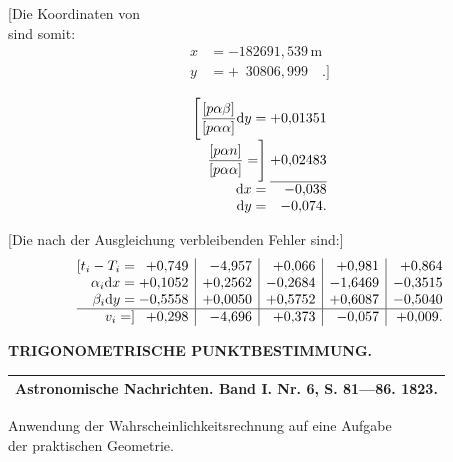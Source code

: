 \noindent
\begin{minipage}[t]{.55\linewidth}
 [Die Koordinaten von \\
 sind somit:
 \[
 \begin{aligned}
  x&=-182691{,}539\,\mathrm{m}\\
  y&=+\phantom{1}30806{,}999\quad .]
 \end{aligned}
 \]
\end{minipage}\hfill
\begin{minipage}[t]{.43\linewidth}
 \[
 \begin{array}{@{}r@{\;}r@{}}
  \Biggl[\dfrac{[p\alpha\beta]}{[p\alpha\alpha]}\mathrm{d}y=&+0{,}01351\\[5pt]
  \dfrac{[p\alpha n]}{[p\alpha\alpha]}=\Biggr]&+0{,}02483\\
  \cline{2-2}
  \mathrm{d}x=&-0{,}038\\
  \mathrm{d}y=&-0{,}074.
 \end{array}
 \]
\end{minipage}\par

[Die nach der Ausgleichung verbleibenden Fehler sind:]
\[
\begin{array}{@{}r@{\;}r|r|r|r|r@{}}
 [t_i-T_i=&+0{,}749&-4{,}957&+0{,}066&+0{,}981&+0{,}864\\
 \alpha_i\mathrm{d}x=&+0{,}1052&+0{,}2562&-0{,}2684&-1{,}6469&-0{,}3515\\
 \beta_i\mathrm{d}y=&-0{,}5558&+0{,}0050&+0{,}5752&+0{,}6087&-0{,}5040\\
 \hline
 v_i=]&+0{,}298&-4{,}696&+0{,}373&-0{,}057&+0{,}009.
\end{array}
\]

\par\clearpage
\noindent\null\hfill{\small\textbf{TRIGONOMETRISCHE PUNKTBESTIMMUNG.}}\hfill{}\par\medskip

\vspace*{3.6\baselineskip}
{\centering
[6.]\par\medskip
{\footnotesize
\begin{tabular}{c}
\hline
Astronomische Nachrichten. Band I. Nr. 6, S. 81—86. 1823.\\
\hline
\end{tabular}\par}
\medskip
Anwendung der Wahrscheinlichkeitsrechnung auf eine Aufgabe\\
der praktischen Geometrie.\par}
\medskip

